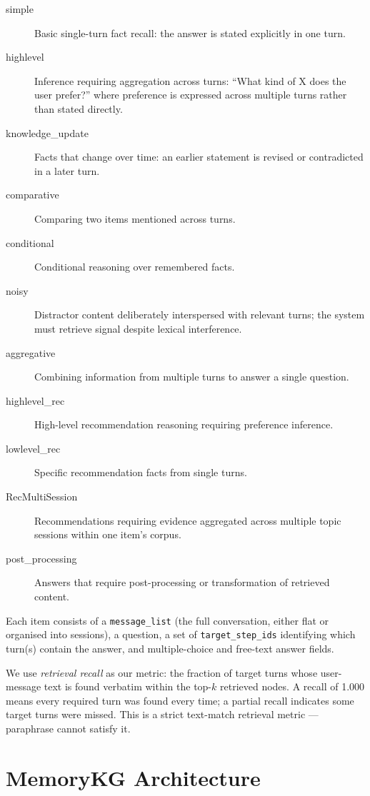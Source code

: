 \documentclass[11pt,a4paper]{article}
\begin{document}
\begin{description}
  \item[simple] Basic single-turn fact recall: the answer is stated
        explicitly in one turn.
  \item[highlevel] Inference requiring aggregation across turns:
        ``What kind of X does the user prefer?'' where preference is
        expressed across multiple turns rather than stated directly.
  \item[knowledge\_update] Facts that change over time: an earlier statement
        is revised or contradicted in a later turn.
  \item[comparative] Comparing two items mentioned across turns.
  \item[conditional] Conditional reasoning over remembered facts.
  \item[noisy] Distractor content deliberately interspersed with relevant
        turns; the system must retrieve signal despite lexical interference.
  \item[aggregative] Combining information from multiple turns to answer
        a single question.
  \item[highlevel\_rec] High-level recommendation reasoning requiring
        preference inference.
  \item[lowlevel\_rec] Specific recommendation facts from single turns.
  \item[RecMultiSession] Recommendations requiring evidence aggregated
        across multiple topic sessions within one item's corpus.
  \item[post\_processing] Answers that require post-processing or
        transformation of retrieved content.
\end{description}

Each item consists of a \texttt{message\_list} (the full conversation,
either flat or organised into sessions), a question, a set of
\texttt{target\_step\_ids} identifying which turn(s) contain the answer,
and multiple-choice and free-text answer fields.

We use \emph{retrieval recall} as our metric: the fraction of target turns
whose user-message text is found verbatim within the top-$k$ retrieved
nodes.
A recall of 1.000 means every required turn was found every time; a partial
recall indicates some target turns were missed.
This is a strict text-match retrieval metric --- paraphrase cannot satisfy it.

\section{MemoryKG Architecture}
\label{sec:arch}
\end{document}

